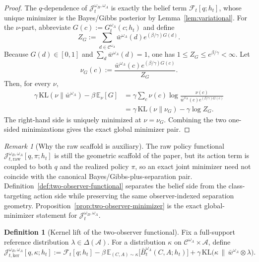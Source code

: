 \documentclass[11pt]{article}
\theoremstyle{definition}
\newtheorem{definition}[theorem]{Definition}
\theoremstyle{remark}
\newtheorem{remark}[theorem]{Remark}
\newcommand{\Acal}{\mathcal{A}}
\newcommand{\Ccal}{\mathcal{C}}
\newcommand{\E}{\mathbb{E}}
\newcommand{\KL}{\mathrm{KL}}
\begin{document}
\begin{proof}
The $q$-dependence of $\mathcal J_t^{\omega_B,\omega_A}$ is exactly the belief term $\mathcal F_t[q;h_t]$, whose unique minimizer is the Bayes/Gibbs posterior by Lemma~\ref{lem:variational}. For the $\nu$-part, abbreviate $G(c):=G_t^{\omega_A}(c;h_t)$ and define
\[
Z_G:=\sum_{d\in\Ccal^{\omega_A}}\bar w^{\omega_A}(d)e^{(\beta/\gamma)G(d)}.
\]
Because $G(d)\in[0,1]$ and $\sum_d\bar w^{\omega_A}(d)=1$, one has $1\le Z_G\le e^{\beta/\gamma}<\infty$. Let
\[
\nu_G(c):=\frac{\bar w^{\omega_A}(c)e^{(\beta/\gamma)G(c)}}{Z_G}.
\]
Then, for every $\nu$,
\begin{align*}
\gamma\,\KL(\nu\|\bar w^{\omega_A})-\beta\,\E_\nu[G]
&=\gamma\sum_c \nu(c)\log\frac{\nu(c)}{\bar w^{\omega_A}(c)e^{(\beta/\gamma)G(c)}}\\
&=\gamma\,\KL(\nu\|\nu_G)-\gamma\log Z_G.
\end{align*}
The right-hand side is uniquely minimized at $\nu=\nu_G$. Combining the two one-sided minimizations gives the exact global minimizer pair.
\end{proof}

\begin{remark}[Why the raw scaffold is auxiliary]
\label{rem:raw-scaffold-auxiliary}
The raw policy functional $\mathcal J_{t,\mathrm{raw}}^{\omega_B,\omega_A}[q,\pi;h_t]$ is still the geometric scaffold of the paper, but its action term is coupled to both $q$ and the realized policy $\pi$, so an exact joint minimizer need not coincide with the canonical Bayes/Gibbs-plus-separation pair. Definition~\ref{def:two-observer-functional} separates the belief side from the class-targeting action side while preserving the same observer-indexed separation geometry. Proposition~\ref{prop:two-observer-minimizer} is the exact global-minimizer statement for $\mathcal J_t^{\omega_B,\omega_A}$.
\end{remark}

\begin{definition}[Kernel lift of the two-observer functional]
\label{def:kernel-functional}
Fix a full-support reference distribution $\lambda\in\Delta(\Acal)$. For a distribution $\kappa$ on $\Ccal^{\omega_A}\times\Acal$, define
\[
\mathcal J_{t,\mathrm{ker}}^{\omega_B,\omega_A}[q,\kappa;h_t]
:=
\mathcal F_t[q;h_t]
-\beta\,\E_{(C,A)\sim\kappa}\!\bigl[\bar B_t^{\omega_A}(C,A;h_t)\bigr]
+\gamma\,\KL\!\bigl(\kappa\,\|\,\bar w^{\omega_A}\otimes\lambda\bigr).
\]
\end{definition}
\end{document}

